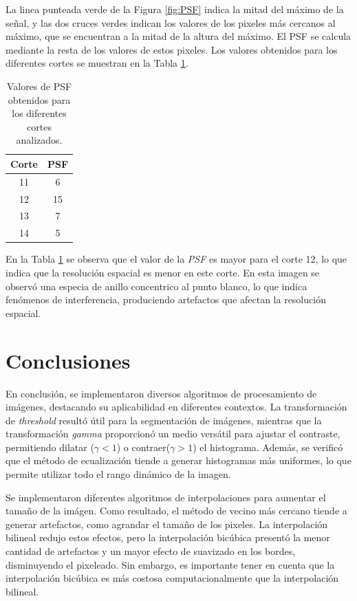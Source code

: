 \documentclass[11pt, twocolumn]{article}
\begin{document}
La linea punteada verde de la Figura \ref{fig:PSF} indica la mitad del máximo de la señal, y las dos cruces verdes indican los valores de los pixeles más cercanos al máximo, que se encuentran a la mitad de la altura del máximo. El PSF se calcula mediante la resta de los valores de estos pixeles. Los valores obtenidos para los diferentes cortes se muestran en la Tabla \ref{tab:PSF}.

\begin{table}[H]
  \centering
  \begin{tabular}{|c|c|}
  \hline
  \textbf{Corte} & \textbf{PSF} \\ \hline
  11             & 6           \\ \hline
  12             & 15           \\ \hline
  13             & 7           \\ \hline
  14             & 5           \\ \hline
  \end{tabular}
  \caption{Valores de PSF obtenidos para los diferentes cortes analizados.}
  \label{tab:PSF}
\end{table}

En la Tabla \ref{tab:PSF} se observa que el valor de la \textit{PSF} es mayor para el corte 12, lo que indica que la resolución espacial es menor en este corte. En esta imagen se observó una especia de anillo concentrico al punto blanco, lo que indica fenómenos de interferencia, produciendo artefactos que afectan la resolución espacial.


\section{Conclusiones}

En conclusión, se implementaron diversos algoritmos de procesamiento de imágenes, destacando su aplicabilidad en diferentes contextos. La transformación de \textit{threshold} resultó útil para la segmentación de imágenes, mientras que la transformación \textit{gamma} proporcionó un medio versátil para ajustar el contraste, permitiendo dilatar ($\gamma < 1$) o contraer($\gamma > 1$) el histograma. Además, se verificó que el método de ecualización tiende a generar histogramas más uniformes, lo que permite utilizar todo el rango dinámico de la imagen.

Se implementaron diferentes algoritmos de interpolaciones para aumentar el tamaño de la imágen. Como resultado, el método de vecino más cercano tiende a generar artefactos, como agrandar el tamaño de los pixeles. La interpolación bilineal redujo estos efectos, pero la interpolación bicúbica presentó la menor cantidad de artefactos y un mayor efecto de suavizado en los bordes, disminuyendo el pixeleado. Sin embargo, es importante tener en cuenta que la interpolación bicúbica es más costosa computacionalmente que la interpolación bilineal.
\end{document}
